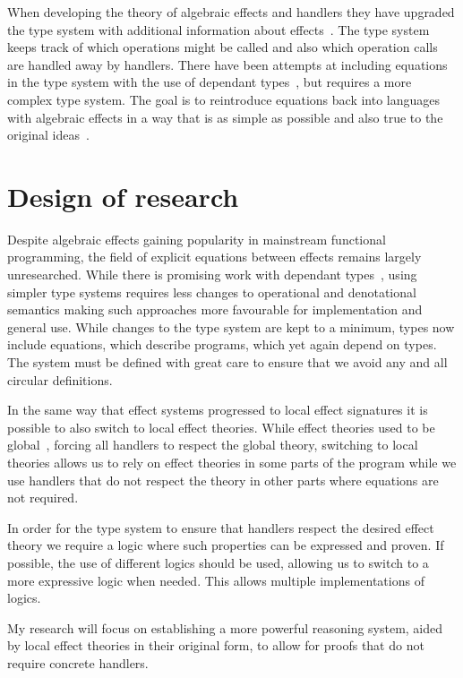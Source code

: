 \documentclass{article}
\begin{document}
When developing the theory of algebraic effects and handlers they have upgraded the type system with additional information about effects~\cite{DBLP:journals/corr/BauerP13, DBLP:conf/icfp/KammarLO13}. The type system keeps track of which operations might be called and also which operation calls are handled away by handlers. There have been attempts at including equations in the type system with the use of dependant types~\cite{DBLP:journals/pacmpl/Ahman18}, but requires a more complex type system. The goal is to reintroduce equations back into languages with algebraic effects in a way that is as simple as possible and also true to the original ideas~\cite{DBLP:phd/ethos/Pretnar10}.

\section*{Design of research}

Despite algebraic effects gaining popularity in mainstream functional programming, the field of explicit equations between effects remains largely unresearched. While there is promising work with dependant types~\cite{DBLP:journals/pacmpl/Ahman18}, using simpler type systems requires less changes to operational and denotational semantics making such approaches more favourable for implementation and general use. While changes to the type system are kept to a minimum, types now include equations, which describe programs, which yet again depend on types. The system must be defined with great care to ensure that we avoid any and all circular definitions. 

In the same way that effect systems progressed to local effect signatures it is possible to also switch to local effect theories. While effect theories used to be global~\cite{DBLP:conf/esop/PlotkinP09}, forcing all handlers to respect the global theory, switching to local theories allows us to rely on effect theories in some parts of the program while we use handlers that do not respect the theory in other parts where equations are not required.

In order for the type system to ensure that handlers respect the desired effect theory we require a logic where such properties can be expressed and proven. If possible, the use of different logics should be used, allowing us to switch to a more expressive logic when needed. This allows multiple implementations of logics.

My research will focus on establishing a more powerful reasoning system, aided by local effect theories in their original form, to allow for proofs that do not require concrete handlers.
\end{document}
